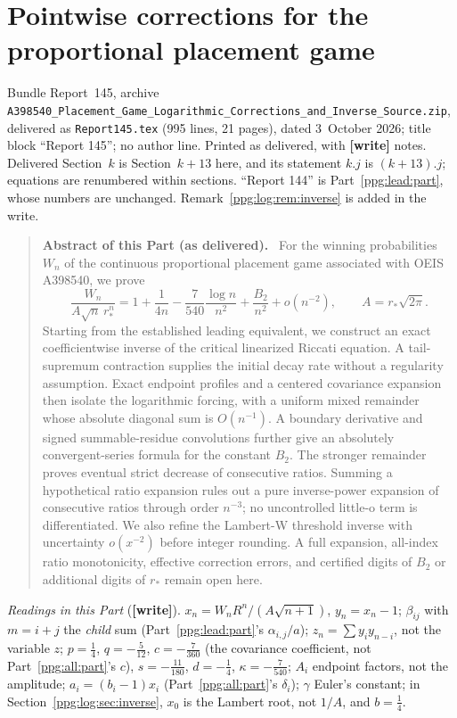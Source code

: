 \documentclass[11pt,letterpaper]{article}
\theoremstyle{remark}\newtheorem{remark}[theorem]{Remark}
\numberwithin{equation}{section}
\newcommand{\file}[1]{\nolinkurl{#1}}
\newcommand{\wtag}{\textup{\textbf{[write]}}}
\newenvironment{partabstract}{\begin{quote}\small\noindent\textbf{Abstract of this Part (as delivered).}\ }{\end{quote}}
\newcommand{\partsource}[1]{\par\noindent\begin{minipage}{\textwidth}\small #1\end{minipage}\par\medskip}
\begin{document}
\part{Pointwise corrections for the proportional placement game}\label{ppg:log:part}
\partsource{Bundle Report~145, archive \file{A398540_Placement_Game_Logarithmic_Corrections_and_Inverse_Source.zip}, delivered as \file{Report145.tex} (995 lines, 21 pages), dated 3~October 2026; title block ``Report 145''; no author line. Printed as delivered, with \textbf{[write]} notes. Delivered Section~$k$ is Section~$k+13$ here, and its statement $k.j$ is $(k+13).j$; equations are renumbered within sections. ``Report 144'' is Part~\ref{ppg:lead:part}, whose numbers are unchanged. Remark~\ref{ppg:log:rem:inverse} is added in the write.}
\begin{partabstract}
For the winning probabilities $W_n$ of the continuous proportional placement game associated with OEIS A398540, we prove
\[
 \frac{W_n}{A\sqrt n\,r_*^n}
 =1+\frac1{4n}-\frac7{540}\frac{\log n}{n^2}
   +\frac{B_2}{n^2}+o(n^{-2}),\qquad
 A=r_*\sqrt{2\pi}.
\]
Starting from the established leading equivalent, we construct an exact coefficientwise inverse of the critical linearized Riccati equation. A tail-supremum contraction supplies the initial decay rate without a regularity assumption. Exact endpoint profiles and a centered covariance expansion then isolate the logarithmic forcing, with a uniform mixed remainder whose absolute diagonal sum is $O(n^{-1})$. A boundary derivative and signed summable-residue convolutions further give an absolutely convergent-series formula for the constant $B_2$. The stronger remainder proves eventual strict decrease of consecutive ratios. Summing a hypothetical ratio expansion rules out a pure inverse-power expansion of consecutive ratios through order $n^{-3}$; no uncontrolled little-o term is differentiated. We also refine the Lambert-W threshold inverse with uncertainty $o(x^{-2})$ before integer rounding. A full expansion, all-index ratio monotonicity, effective correction errors, and certified digits of $B_2$ or additional digits of $r_*$ remain open here.
\end{partabstract}
{\small\emph{Readings in this Part} (\wtag). $x_n=W_nR^n/(A\sqrt{n+1})$, $y_n=x_n-1$; $\beta_{ij}$ with $m=i+j$ the \emph{child} sum (Part~\ref{ppg:lead:part}'s $\alpha_{i,j}/a$); $z_n=\sum y_iy_{n-i}$, not the variable $z$; $p=\frac14$, $q=-\frac5{12}$, $c=-\frac7{360}$ (the covariance coefficient, not Part~\ref{ppg:all:part}'s $c$), $s=-\frac{11}{180}$, $d=-\frac14$, $\kappa=-\frac7{540}$; $A_i$ endpoint factors, not the amplitude; $a_i=(b_i-1)x_i$ (Part~\ref{ppg:all:part}'s $\delta_i$); $\gamma$ Euler's constant; in Section~\ref{ppg:log:sec:inverse}, $x_0$ is the Lambert root, not $1/A$, and $b=\frac14$.\par}
\end{document}
